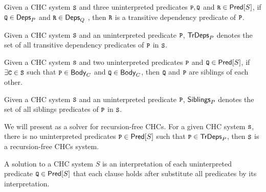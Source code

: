 \begin{defn}
  Given a CHC system $\cc{S}$ and three uninterpreted predicates $\cc{P},
  \cc{Q}$ and $\cc{R} \in \predof{S}$, if $\cc{Q} \in \depsof{P}$ and $\cc{R} \in \depsof {Q}$
  , then $\cc{R}$ is a transitive dependency predicate of $\cc{P}$.
\end{defn}
%
Given a CHC system $\cc{S}$ and an uninterpreted predicate $\cc{P}$, $\mathsf{TrDeps}_{P}$
denotes the set of all transitive dependency predicates of $\cc{P}$ in $\cc{S}$.
%

\begin{defn}
  Given a CHC system $\cc{S}$ and two uninterpreted predicates $\cc{P}$ and
  $\cc{Q} \in \predof{S}$, if $\exists \cc{C} \in \cc{S}$ such that $\cc{P} \in \bodyof{C}$
  and $\cc{Q} \in \bodyof{C}$, then $\cc{Q}$ and $\cc{P}$ are siblings of each other.
\end{defn}
%
Given a CHC system $\cc{S}$ and an uninterpreted predicate $\cc{P}$, $\mathsf{Siblings}_{P}$
denotes the set of all siblings predicates of $\cc{P}$ in $\cc{S}$.
%



We will present \sys as a solver for recursion-free CHCs.
%
For a given CHC system $\cc{S}$, there is no uninterpreted predicates $\cc{P} \in \predof{S}$ 
such that $\cc{P} \in \tdepsof{P}$, then $\cc{S}$ is a recursion-free CHCs system.

%
A solution to a CHC system $S$ is an interpretation of each
uninterpreted predicate $\cc{Q} \in \predof{S}$ that each clause holds
after substitute all predicates by its interpretation.

